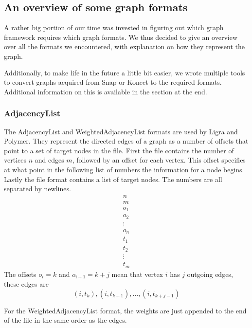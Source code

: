 
\subsection{An overview of some graph formats}
A rather big portion of our time was invested in figuring out which graph framework requires which graph formats. We thus decided to give an overview over all the formats we encountered, with explanation on how they represent the graph.

Additionally, to make life in the future a little bit easier, we wrote multiple tools to convert graphs acquired from Snap or Konect to the required formats. Additional information on this is available in the section  at the end.

\subsubsection{AdjacencyList}
The AdjacencyList and WeightedAdjacencyList formats\cite{adjListFormat} are used by Ligra and Polymer. They represent the directed edges of a graph as a number of offsets that point to a set of target nodes in the file.
First the file contains the number of vertices $n$ and edges $m$, followed by an offset for each vertex. This offset specifies at what point in the following list of numbers the information for a node begins.
Lastly the file format contains a list of target nodes.
The numbers are all separated by newlines.
\begin{gather*}
n\\
m\\
o_1\\
o_2\\
\vdots\\
o_n\\
t_1\\
t_2\\
\vdots\\
t_m
\end{gather*}
The offsets $o_i=k$ and $o_{i+1}=k+j$ mean that vertex $i$ has $j$ outgoing edges, these edges are
\begin{equation*}
	(i,t_k),(i,t_{k+1}),\ldots,(i,t_{k+j-1})
\end{equation*}

For the WeightedAdjacencyList format, the weights are just appended to the end of the file in the same order as the edges.

